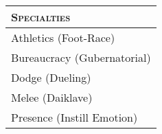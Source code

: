 \begin{figure}[b!]
    \noindent%
    \begin{minipage}[t]{\dimexpr0.60\linewidth - 10pt}%
        \PrintArmorList
    \end{minipage}%
    \hspace{\fill}%
    \begin{minipage}[t]{\dimexpr0.40\linewidth - 10pt}%
        \begin{xltabular}{\textwidth}{X}
            \bfseries\scshape Specialties \\
            \hline%
            \endhead%
            Athletics (Foot-Race) \\
            Bureaucracy (Gubernatorial) \\
            Dodge (Dueling) \\
            Melee (Daiklave) \\
            Presence (Instill Emotion) \\
        \end{xltabular}
    \end{minipage}

    \vspace{0.5\baselineskip}

    \begin{PrintPools}%
        \PrintPersonalEssencePool%
        \PrintPeripheralEssencePool%
        \PrintWillpowerPool%
    \end{PrintPools}

    \vspace{-\baselineskip}

    \begin{minipage}[t]{\dimexpr0.60\linewidth - 10pt}%
        \PrintHealthLevels%
    \end{minipage}%
    \hspace{\fill}%
    \begin{minipage}[t]{\dimexpr0.40\linewidth - 10pt}%
        \PrintMiscStats
    \end{minipage}
\end{figure}


\PrintAttributeList

\vspace{0pt plus 12pt minus 12pt}

\PrintAbilityList

\vspace{0pt plus 12pt minus 12pt}

\PrintWeaponList


\cleardoublepage
{}
\PrintCharmList{}

\twocolumn

